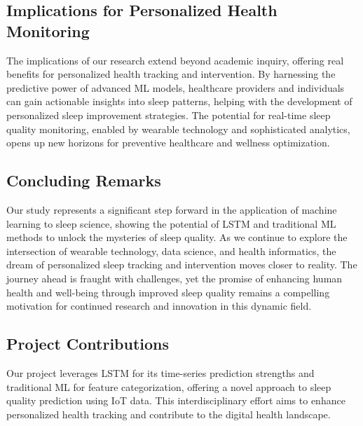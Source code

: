 \documentclass[10pt]{extarticle}
\begin{document}
\subsection{Implications for Personalized Health Monitoring}

The implications of our research extend beyond academic inquiry, offering real benefits for personalized health tracking and intervention. By harnessing the predictive power of advanced ML models, healthcare providers and individuals can gain actionable insights into sleep patterns, helping with the development of personalized sleep improvement strategies. The potential for real-time sleep quality monitoring, enabled by wearable technology and sophisticated analytics, opens up new horizons for preventive healthcare and wellness optimization.

\subsection{Concluding Remarks}

Our study represents a significant step forward in the application of machine learning to sleep science, showing the potential of LSTM and traditional ML methods to unlock the mysteries of sleep quality. As we continue to explore the intersection of wearable technology, data science, and health informatics, the dream of personalized sleep tracking and intervention moves closer to reality. The journey ahead is fraught with challenges, yet the promise of enhancing human health and well-being through improved sleep quality remains a compelling motivation for continued research and innovation in this dynamic field.

\subsection{Project Contributions}

Our project leverages LSTM for its time-series prediction strengths and traditional ML for feature categorization, offering a novel approach to sleep quality prediction using IoT data. This interdisciplinary effort aims to enhance personalized health tracking and contribute to the digital health landscape.

\newpage

\printbibliography{}

\newpage
\end{document}
